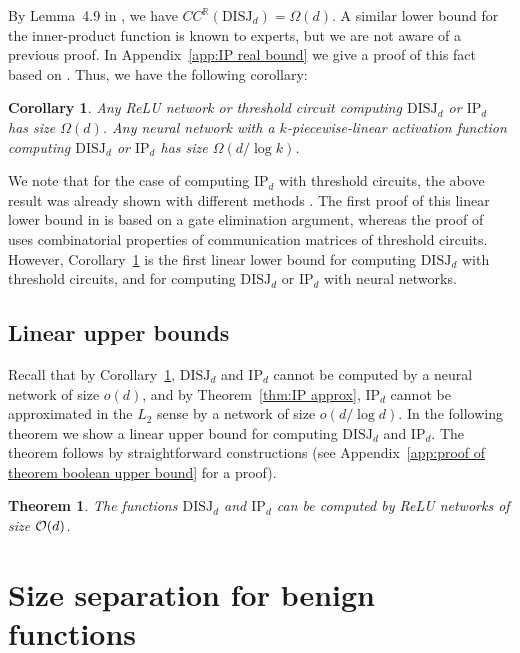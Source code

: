 \documentclass[11pt]{article}
\newtheorem{theorem}{Theorem}[section]
\newtheorem{corollary}{Corollary}[section]
\newcommand{\co}{{\cal O}}
\begin{document}
By Lemma~4.9 in \cite{chattopadhyay2019equality}, we have 
$CC^{\mathbb{R}}(\text{DISJ}_d)=\Omega(d)$.
A similar lower bound for the inner-product function is known to experts, but we are not aware of a previous proof. In Appendix~\ref{app:IP real bound} we give a proof of this fact based on \cite{chattopadhyay2019equality}. Thus, we have the following corollary:
\begin{corollary}
\label{cor:CC_real}
	Any ReLU network or threshold circuit computing $\text{DISJ}_d$ or $\text{IP}_d$ has size $\Omega(d)$.
	Any neural network with a $k$-piecewise-linear activation function computing $\text{DISJ}_d$ or $\text{IP}_d$ has size $\Omega(d/\log k)$.
\end{corollary}

We note that for the case of computing $\text{IP}_d$ with threshold circuits, the above result was already shown with different methods \citep{groeger1993linear,jukna2012boolean,roychowdhury1994lower}. The first proof of this linear lower bound in \cite{groeger1993linear} is based on a gate elimination argument, whereas the proof of \cite{roychowdhury1994lower} uses combinatorial properties of communication matrices of threshold circuits. 
However, Corollary~\ref{cor:CC_real} is the first linear lower bound for computing $\text{DISJ}_d$ with threshold circuits, and for computing $\text{DISJ}_d$ or $\text{IP}_d$ with neural networks.

\subsection{Linear upper bounds}

Recall that by Corollary~\ref{cor:CC_real}, $\text{DISJ}_d$ and $\text{IP}_d$ cannot be computed by a neural network of size $o(d)$, and by Theorem~\ref{thm:IP approx}, $\text{IP}_d$ cannot be approximated in the $L_2$ sense by a network of size $o(d/\log d)$. In the following theorem we show a linear upper bound for computing $\text{DISJ}_d$ and $\text{IP}_d$. The theorem follows by straightforward constructions (see Appendix~\ref{app:proof of theorem boolean upper bound} for a proof).

\begin{theorem}
\label{thm:boolean upper bound}
	The functions $\text{DISJ}_d$ and $\text{IP}_d$ can be computed by ReLU networks of size $\co(d)$.
\end{theorem}


\section{Size separation for benign functions}
\label{sec:separation real}
\end{document}
